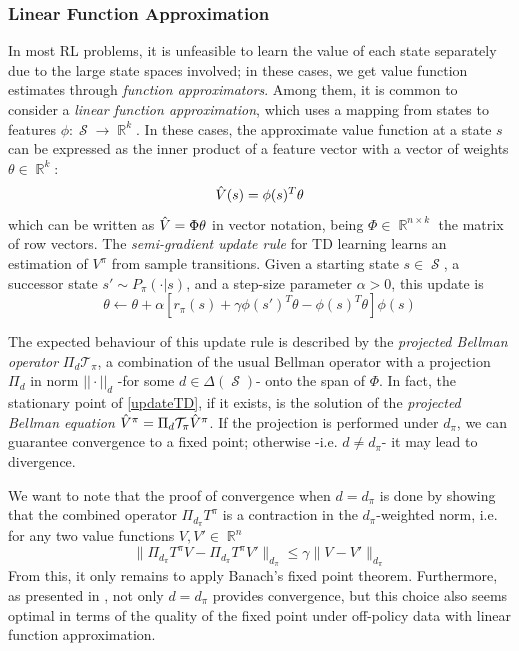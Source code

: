\documentclass[12pt,a4paper,openright,twoside]{article}
\DeclareMathOperator*{\R}{\mathbb{R}}
\DeclareMathOperator*{\Sspace}{\mathcal{S}}
\numberwithin{equation}{section}
\theoremstyle{definition}
\theoremstyle{remark}
\theoremstyle{plain}
\begin{document}
\subsubsection*{Linear Function Approximation}
In most RL problems, it is unfeasible to learn the value of each state separately due to the large state spaces involved; in these cases, we get value function estimates through \textit{function approximators}. Among them, it is common to consider a \textit{linear function approximation}, which uses a mapping from states to features $\phi: \Sspace \rightarrow \R^k$. In these cases, the approximate value function at a state $s$ can be expressed as the inner product of a feature vector with a vector of weights $\theta \in \R^k$:
\begin{equation} \label{linearApproxSV}
    \Hat{V}(s) = \phi(s)^T \theta
\end{equation}
which can be written as $\Hat{V} = \Phi \theta$ in vector notation, being $\Phi \in \R^{n\times k}$ the matrix of row vectors. The \textit{semi-gradient update rule} for TD learning\cite{TD} learns an estimation of $V^\pi$ from sample transitions. Given a starting state $s\in\Sspace$, a successor state $s'\sim P_\pi(\cdot | s)$, and a step-size parameter $\alpha > 0$, this update is
\begin{equation} \label{updateTD}
    \theta \leftarrow \theta + \alpha \left[ r_\pi(s) + \gamma\phi(s')^T \theta - \phi(s)^T \theta \right] \phi(s)
\end{equation}

The expected behaviour of this update rule is described by the \textit{projected Bellman operator} $\Pi_d \mathcal{T}_\pi$, a combination of the usual Bellman operator with a projection $\Pi_d$ in norm $||\cdot||_d$ -for some $d\in\Delta(\Sspace)$- onto the span of $\Phi$\cite{projectedBellman}. In fact, the stationary point of \ref{updateTD}, if it exists, is the solution of the \textit{projected Bellman equation} $\Hat{V}^\pi = \Pi_d \mathcal{T}_\pi \Hat{V}^\pi$. If the projection is performed under $d_\pi$, we can guarantee convergence to a fixed point\cite{rlformulation}; otherwise -i.e. $d \neq d_\pi$- it may lead to divergence.

We want to note that the proof of convergence when $d=d_\pi$ is done by showing that the combined operator $\Pi_{d_\pi} T^\pi$ is a contraction in the $d_\pi$-weighted norm, i.e. for any two value functions $V,V' \in \R^n$
\begin{equation*}
	\| \Pi_{d_\pi} T^\pi V - \Pi_{d_\pi} T^\pi V' \|_{d_\pi} \leq \gamma \| V-V' \|_{d_\pi}
\end{equation*}
From this, it only remains to apply Banach's fixed point theorem. 
Furthermore, as presented in \cite{DCOPTD}, not only $d=d_\pi$ provides convergence, but this choice also seems optimal in terms of the quality of the fixed point under off-policy data with linear function approximation.
\end{document}
